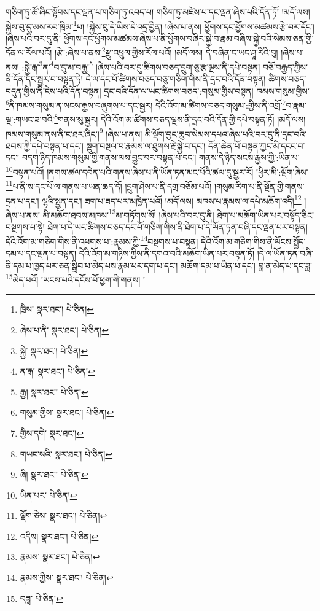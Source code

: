 གཅིག་ཏུ་ཚོ་ཞིང་སྟོབས་དང་ལྡན་པ་གཅིག་ཏུ་འབད་པ། གཅིག་ཏུ་མཛེས་པ་དང་ལྡན་ཞེས་པའི་དོན་ཏོ། །མདོ་ལས། སྐྱེས་བུ་དུ་མས་རབ་ཁྲིམ་\footnote{ཁྲིས་  སྣར་ཐང་།  པེ་ཅིན། }པ། །སྐྱེས་བུ་དེ་ཡིས་དེ་འདྲ་བྱིན། །ཞེས་པ་ནས། ཕྱོགས་དང་ཕྱོགས་མཚམས་རྩེ་བར་དོང་། །ཞེས་པའི་བར་དུ་ནི། ཕྱོགས་དང་ཕྱོགས་མཚམས་ཞེས་པ་ནི་ཕྱོགས་བཞིར་སྐྱེ་བ་རྣམ་བཞིས་སྐྱེ་བའི་སེམས་ཅན་གྱི་དོན་ལ་རོལ་པའོ། །རྩེ་:ཞེས་པ་ནས་\footnote{ཞེས་པ་ནི་  སྣར་ཐང་།  པེ་ཅིན། }རྫུ་འཕྲུལ་གྱིས་རོལ་པའོ། །མདོ་ལས། དེ་བཞིན་ང་ཡང་ཤཱ་རིའི་བུ། །ཞེས་པ་ནས། :སྐྱེ་རྒ་\footnote{སྐྱེ་  སྣར་ཐང་།  པེ་ཅིན། }ན་\footnote{ན་རྒ་  སྣར་ཐང་།  པེ་ཅིན། }བ་དུ་མ་བརྒྱ།\footnote{རྒྱ།  སྣར་ཐང་།  པེ་ཅིན། } །ཞེས་པའི་བར་དུ་ཚིགས་བཅད་དྲུག་ཅུ་རྩ་ལྔས་ནི་དཔེ་བསྟན། བཅོ་བརྒྱད་ཀྱིས་ནི་དོན་དང་སྦྱར་བ་བསྟན་ཏེ། དེ་ལ་དང་པོ་ཚིགས་བཅད་བཅུ་གཅིག་གིས་ནི་དྲང་བའི་དོན་བསྟན། ཚིགས་བཅད་བདུན་གྱིས་ནི་ངེས་པའི་དོན་བསྟན། དྲང་བའི་དོན་ལ་ཡང་ཚིགས་བཅད་:གསུམ་གྱིས་བསྟན། ཁམས་གསུམ་གྱིས་\footnote{གསུམ་གྱིས་  སྣར་ཐང་།  པེ་ཅིན། }ནི་ཁམས་གསུམ་ན་སངས་རྒྱས་བཞུགས་པ་དང་སྦྱར། དེའི་འོག་མ་ཚིགས་བཅད་གསུམ་:གྱིས་ནི་འགྲོ་\footnote{གྱིས་དགེ་  སྣར་ཐང་། }བ་རྣམ་ལྔ་:གཡང་ཟ་བའི་\footnote{གཡང་སའི་  སྣར་ཐང་།  པེ་ཅིན། }གནས་སུ་སྦྱར། དེའི་འོག་མ་ཚིགས་བཅད་ལྔས་ནི་དྲང་བའི་དོན་གྱི་དཔེ་བསྟན་ཏོ། །མདོ་ལས། ཁམས་གསུམ་ནས་ནི་ང་ཐར་ཞིང་།\footnote{ཞི།  སྣར་ཐང་།  པེ་ཅིན། } །ཞེས་པ་ནས། མི་ལྡོག་བྱང་ཆུབ་སེམས་དཔའ་ཞེས་པའི་བར་དུ་ནི་དྲང་བའི་ཐབས་ཀྱི་དཔེ་བསྟན་པ་དང་། སྡུག་བསྔལ་བ་རྣམས་ལ་ཐུགས་རྗེ་སྐྱེ་བ་དང་། དོན་ཆེན་པོ་བསྟན་ཀྱང་མི་དངང་བ་དང་། བདག་ཉིད་ཁམས་གསུམ་གྱི་གནས་ལས་བྱུང་བར་བསྟན་པ་དང་། གནས་དེ་ཉིད་སངས་རྒྱས་ཀྱི་:ཡིན་པ་\footnote{ཡིན་པར་  པེ་ཅིན། }བསྟན་པའོ། །ནགས་ཚལ་དབེན་པའི་གནས་ཞེས་པ་ནི་ཡོན་ཏན་མང་པོའི་ཚལ་དུ་སྦྱར་རོ། །ཕྱིར་མི་:ལྡོག་ཞེས་\footnote{ལྡོག་ཅེས་  སྣར་ཐང་།  པེ་ཅིན། }པ་ནི་ས་དང་པོ་ལ་གནས་པ་ཡན་ཆད་དོ། །དྲུག་ཤེས་པ་ནི་དགྲ་བཅོམ་པའོ། །གསུམ་རིག་པ་ནི་སྔོན་གྱི་གནས་དྲན་པ་དང་། ལྷའི་སྤྱན་དང་། ཟག་པ་ཟད་པར་མཁྱེན་པའོ། །མདོ་ལས། མཁས་པ་རྣམས་ལ་དཔེ་མཆོག་འདི།\footnote{འདིས།  སྣར་ཐང་།  པེ་ཅིན། } །ཞེས་པ་ནས། མི་མཆོག་ཐབས་མཁས་\footnote{རྣམས་  སྣར་ཐང་།  པེ་ཅིན། }མ་གཏོགས་སོ། །ཞེས་པའི་བར་དུ་ནི། ཐེག་པ་མཆོག་ཡིན་པར་བསྟོད་ཅིང་བསྔགས་པ་སྟེ། ཐེག་པ་དེ་ཡང་ཚིགས་བཅད་དང་པོ་གཅིག་གིས་ནི་ཐེག་པ་དེ་ཡོན་ཏན་བཞི་དང་ལྡན་པར་བསྟན། དེའི་འོག་མ་གཅིག་གིས་ནི་འཕགས་པ་:རྣམས་ཀྱི་\footnote{རྣམས་ཀྱིས་  སྣར་ཐང་།  པེ་ཅིན། }བསྔགས་པ་བསྟན། དེའི་འོག་མ་གཅིག་གིས་ནི་ལོངས་སྤྱོད་དམ་པ་དང་ལྡན་པ་བསྟན། དེའི་འོག་མ་གཉིས་ཀྱིས་ནི་དགའ་བའི་མཆོག་ཡིན་པར་བསྟན་ཏོ། །དེ་ལ་ཡོན་ཏན་བཞི་ནི་དམ་པ་ཁྱད་པར་ཅན་སྒྲིབ་པ་མེད་པས་རྣམ་པར་དག་པ་དང་། མཆོག་དམ་པ་ཡིན་པ་དང་། བླ་ན་མེད་པ་དང་ཟླ་\footnote{བཟླ་  པེ་ཅིན། }མེད་པའོ། །ཡངས་པའི་དངོས་པོ་ཕྱག་གི་གནས། །
